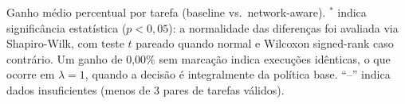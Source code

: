 \begin{table}[htbp]
\vspace{2mm}
\footnotesize Ganho médio percentual por tarefa (baseline vs.\ network-aware). $^{*}$ indica significância estatística ($p<0{,}05$): a normalidade das diferenças foi avaliada via Shapiro-Wilk, com teste $t$ pareado quando normal e Wilcoxon signed-rank caso contrário. Um ganho de 0,00\% sem marcação indica execuções idênticas, o que ocorre em $\lambda = 1$, quando a decisão é integralmente da política base. ``--'' indica dados insuficientes (menos de 3 pares de tarefas válidos).
\end{table}
